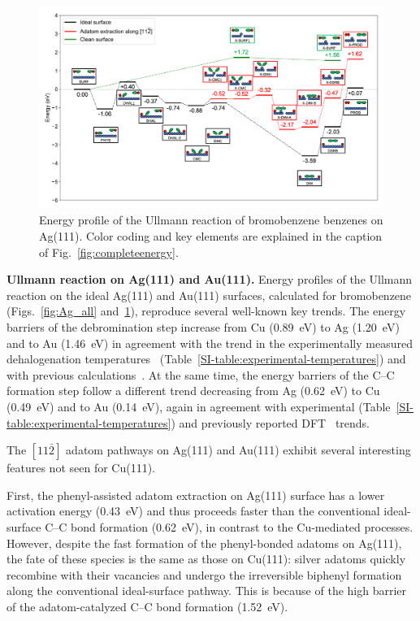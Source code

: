 \documentclass[aps,prb,reprint,amsmath,amssymb]{revtex4-1}
\begin{document}
\begin{figure}[hbt]
\centering
\includegraphics[width=1.\textwidth]{Fig/Au_mainfile.png}
\caption{Energy profile of the Ullmann reaction of bromobenzene benzenes on Ag(111). Color coding and key elements are explained in the caption of Fig.~\ref{fig:completeenergy}.}
\label{fig:Au_all}
\end{figure}


\textbf{Ullmann reaction on Ag(111) and Au(111).}
%
Energy profiles of the Ullmann reaction on the ideal Ag(111) and Au(111) surfaces, calculated for bromobenzene (Figs.~\ref{fig:Ag_all} and~\ref{fig:Au_all}), reproduce several well-known key trends.  
The energy barriers of the debromination step increase from Cu (\SI{0.89}{\electronvolt}) to Ag (\SI{1.20}{\electronvolt}) and to Au (\SI{1.46}{\electronvolt}) in agreement with the trend in the experimentally measured dehalogenation temperatures~\cite{ullmann_52,ullmann_87,ullmann_67} (Table~\ref{SI-table:experimental-temperatures}) and with previous calculations~\cite{jacs2013}.
At the same time, the energy barriers of the C--C formation step follow a different trend decreasing from Ag (\SI{0.62}{\electronvolt}) to Cu (\SI{0.49}{\electronvolt}) and to Au (\SI{0.14}{\electronvolt}), again in agreement with experimental (Table~\ref{SI-table:experimental-temperatures}) and previously reported DFT~\cite{jacs2013} trends.

The $[11\bar{2}]$ adatom pathways on Ag(111) and Au(111) exhibit several interesting features not seen for Cu(111).

First, the phenyl-assisted adatom extraction on Ag(111) surface has a lower activation energy (\SI{0.43}{\electronvolt}) and thus proceeds faster than the conventional ideal-surface C--C bond formation (\SI{0.62}{\electronvolt}), in contrast to the Cu-mediated processes. However, despite the fast formation of the phenyl-bonded adatoms on Ag(111), the fate of these species is the same as those on Cu(111): silver adatoms quickly recombine with their vacancies and undergo the irreversible biphenyl formation along the conventional ideal-surface pathway. This is because of the high barrier of the adatom-catalyzed C--C bond formation (\SI{1.52}{\electronvolt}).
\end{document}

